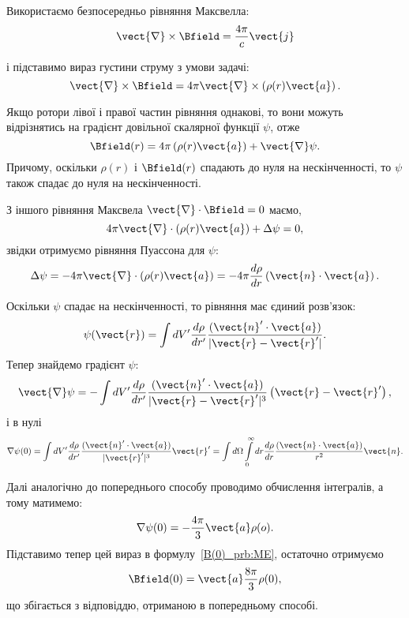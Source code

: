 \begin{problem}
\begin{solution}
	Використаємо безпосередньо рівняння Максвелла:
	\[
		\vect{\nabla}\times\Bfield = \frac{4\pi}{c}\vect{j}
	\]

	і підставимо вираз густини струму з умови задачі:
	\[
		\vect{\nabla}\times\Bfield = 4\pi\vect{\nabla}\times \left( \rho(r) \vect{a}\right).
	\]

	Якщо ротори лівої і правої частин рівняння однакові, то вони можуть відрізнятись на градієнт довільної скалярної функції $\psi$, отже
	\begin{equation}\label{B(0)_prb:ME}
		\Bfield(r) = 4\pi \left( \rho(r) \vect{a}\right) + \vect{\nabla}\psi.
	\end{equation}
	Причому, оскільки $\rho(r)$   і $\Bfield(r)$  спадають до нуля на нескінченності,  то $\psi$  також спадає до нуля на нескінченності.

	З іншого рівняння Максвела $\vect{\nabla} \cdot \Bfield = 0$ маємо,
	\[
		4\pi \vect{\nabla} \cdot \left( {\rho (r){\vect{a}}} \right) + \Delta \psi  = 0,
	\]
	звідки отримуємо рівняння Пуассона для $\psi$:
	\[
		\Delta \psi = - 4\pi \vect{\nabla} \cdot \left( {\rho (r){\vect{a}}} \right) = - 4\pi\frac{d\rho}{dr} \left( \vect{n} \cdot \vect{a} \right).
	\]

	Оскільки $\psi$ спадає на нескінченності, то рівняння має єдиний розв'язок:
	\[
		\psi (\vect{r}) = \int dV' \frac{d\rho}{dr'}\frac{(\vect{n}'\cdot \vect{a})}{|\vect{r} - \vect{r}'|}.
	\]
	Тепер знайдемо градієнт $\psi$:
	\[
		\vect{\nabla}\psi = - \int {dV'} \frac{d\rho}{dr'}\frac{(\vect{n}' \cdot \vect{a})}{|\vect{r} - \vect{r}'|^3}\left( {\vect{r} - \vect{r}'} \right),
	\]
	і в нулі
	\[
		\nabla \psi (0) = \int dV' \frac{d\rho}{dr'}\frac{(\vect{n}' \cdot \vect{a})}{|\vect{r}'|^3} \vect{r}'= \int {d\Omega} \int\limits_0^\infty  dr \frac{d\rho}{dr}\frac{(\vect{n} \cdot \vect{a})}{r^2}{\vect{n}}.
	\]

	Далі аналогічно до попереднього способу проводимо обчислення інтегралів, а тому матимемо:
	\[
		\nabla \psi (0) = -\frac{4\pi}{3}\vect{a}\rho(o).
	\]
	Підставимо тепер цей вираз в формулу~\eqref{B(0)_prb:ME}, остаточно отримуємо
	\[
		\Bfield(0) = \vect{a}\frac{8\pi}{3}\rho(0),
	\]
	що збігається з відповіддю, отриманою в попередньому способі.
\end{solution}
\end{problem}

